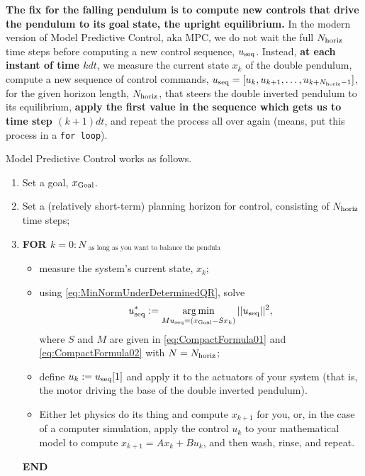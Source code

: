 \vspace*{.2cm}

\textbf{The fix for the falling pendulum is to compute new controls that drive the pendulum to its goal state, the upright equilibrium.} In the modern version of Model Predictive Control, aka MPC, we do not wait the full $N_{\rm horiz}$ time steps before computing a new control sequence, $u_{\rm seq}$. Instead, \textbf{at each instant of time $k dt$}, we measure the current state $x_k$ of the double pendulum, compute a new sequence of control commands, $u_{\rm seq} = [u_k, u_{k+1}, \ldots, u_{k+N_{\rm horiz}-1}]$, for the given horizon length, $N_{\rm horiz}$, that steers the double inverted pendulum to its equilibrium, \textbf{apply the first value in the sequence which gets us to time step $(k+1)dt$}, and repeat the process all over again (means, put this process in a \texttt{for\,loop}). 

\vspace*{.2cm}

\begin{tcolorbox}[sharp corners, colback=green!30, colframe=green!80!blue, title=\textbf{MPC: Closed-loop Control via Least-squares Optimization }]
Model Predictive Control works as follows. 
\begin{enumerate}
 \renewcommand{\labelenumi}{(\alph{enumi})}
\setlength{\itemsep}{.1cm}   
\item Set a goal, $x_{\rm Goal}$.
\item Set a (relatively short-term) planning horizon for control, consisting of $N_{\rm horiz}$ time steps;
\item \textbf{ \large FOR $k=0:N_{ \text{ as long as you want to balance the pendula} }$ }
\begin{itemize}
\setlength{\itemsep}{.1cm}
\item measure the system's current state, $x_k$;
\item using \eqref{eq:MinNormUnderDeterminedQR}, solve $$u_{\rm seq}^\ast:= \operatorname*{arg\,min}_{M u_{\rm seq} =\left(x_{\rm Goal} - S x_k\right)} ||u_{\rm seq}||^2,$$ where $S$ and $M$ are given in \eqref{eq:CompactFormula01} and \eqref{eq:CompactFormula02} with $N=N_{\rm horiz}$;  
\item define $u_k:= u_{\rm seq}[1]$ and apply it to the actuators of your system (that is, the motor driving the base of the double inverted pendulum).
\item Either let physics do its thing and compute $x_{k+1}$ for you, or, in the case of a computer simulation, apply the control $u_k$ to your mathematical model to compute $x_{k+1} = A x_k + Bu_k$, and then wash, rinse, and repeat.
\end{itemize}
\textbf{\large END}
\end{enumerate}
\end{tcolorbox}

